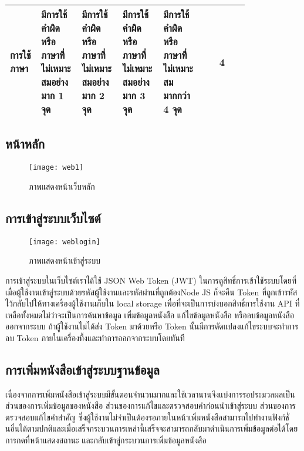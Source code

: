 \begin{table}[H]
\begin{flushleft}
\begin{tabular}{|p{0.13\linewidth}|p{0.17\linewidth}|p{0.17\linewidth}|p{0.17\linewidth}|p{0.17\linewidth}|c|}
การใช้ภาษา           & มีการใช้คำผิดหรือภาษาที่ไม่เหมาะสมอย่างมาก   1 จุด                                                               &  มีการใช้คำผิดหรือภาษาที่ไม่เหมาะสมอย่างมาก   2 จุด                                                &มีการใช้คำผิดหรือภาษาที่ไม่เหมาะสมอย่างมาก 3 จุด                                                                 & มีการใช้คำผิดหรือภาษาที่ไม่เหมาะสมมากกว่า 4 จุด                                               & 4           \\ \hline
\end{tabular}
\end{flushleft}
\end{table}

\subsection{หน้าหลัก}
\begin{figure}[H]
    \centering
    \texttt{[image: web1]}
    \caption{ภาพแสดงหน้าเว็บหลัก}\label{fig:web1}
\end{figure}

\subsection{การเข้าสู่ระบบเว็บไซต์}
\begin{figure}[H]
    \centering
    \texttt{[image: weblogin]}
    \caption{ภาพแสดงหน้าเข้าสู่ระบบ}\label{fig:weblogin}
\end{figure}
การเข้าสู่ระบบในเว็บไซต์เราได้ใช้ JSON Web Token (JWT) ในการดูสิทธิ์การเข้าใช้ระบบโดยที่เมื่อผู้ใช้งานเข้าสู่ระบบด้วยรหัสผู้ใช้งานและรหัสผ่านที่ถูกต้องNode JS ก็จะคืน Token ที่ถูกเข้ารหัสไว้กลับไปให้ทางเครื่องผู้ใช้งานเก็บใน local storage เพื่อที่จะเป็นการบ่งบอกสิทธิ์การใช้งาน API ที่เหลือทั้งหมดไม่ว่าจะเป็นการค้นหาข้อมูล เพิ่มข้อมูลหนังสือ แก้ไขข้อมูลหนังสือ หรือลบข้อมูลหนังสือออกจากระบบ ถ้าผู้ใช้งานไม่ได้ส่ง Token มาด้วยหรือ Token นั้นมีการดัดแปลงแก้ไขระบบจะทำการลบ Token ภายในเครื่องทึ้งและทำการออกจากระบบโดยทันที

\subsection{การเพิ่มหนังสือเข้าสู่ระบบฐานข้อมูล}
เนื่องจากการเพิ่มหนังสือเข้าสู่ระบบมีขั้นตอนจำนวนมากและใช้เวลานานจึงแบ่งการรอประมวลผลเป็นส่วนของการเพิ่มข้อมูลของหนังสือ ส่วนของการแก้ไขและตรวจสอบคำก่อนนำเข้าสู่ระบบ ส่วนของการตรวจสอบแก้ไขคำสำคัญ ซึ่งผู้ใช้งานไม่จำเป็นต้องรอภายในหน้าเพิ่มหนังสือสามารถไปทำงานฟังก์ชั่นอื่นได้ตามปกติและเมื่อเสร็จกระบวนการเหล่านี้เสร็จจะสามารถกลับมาดำเนินการเพิ่มข้อมูลต่อได้โดยการกดที่หน้าแสดงสถานะ และกลับเข้าสู่กระบวนการเพิ่มข้อมูลหนังสือ
